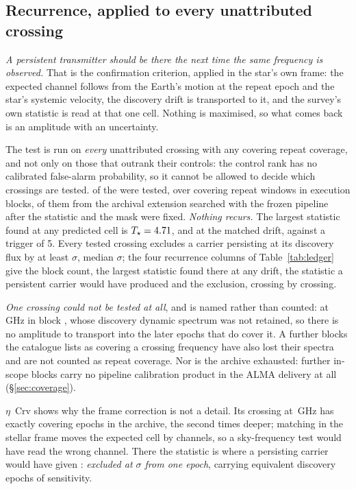 \subsection{Recurrence, applied to every unattributed crossing}
\label{sec:etacrv}

\emph{A persistent transmitter should be there the next time the same
frequency is observed.} That is the confirmation criterion, applied in the
star's own frame: the expected channel follows from the Earth's motion at the
repeat epoch and the star's systemic velocity, the discovery drift is
transported to it, and the survey's own statistic is read at that one cell.
Nothing is maximised, so what comes back is an amplitude with an uncertainty.

The test is run on \emph{every} unattributed crossing with any covering repeat
coverage, and not only on those that outrank their controls: the control rank
has no calibrated false-alarm probability, so it cannot be allowed to decide
which crossings are tested. \RcNTested{} of the \NUnattributed{} were tested,
over \RcNRepeatMeas{} covering repeat windows in \RcNRepeatBlock{} execution
blocks, \RcNRepeatFollow{} of them from the archival extension searched with
the frozen pipeline after the statistic and the mask were fixed. \emph{Nothing
recurs.} The largest statistic found at any predicted cell is
$T_\star=4.71$, and \RcTMatched{} at the matched drift, against a trigger
of 5. Every
tested crossing excludes a carrier persisting at its discovery flux by at
least \RcExclMin$\sigma$, median \RcExclMed$\sigma$; the four recurrence
columns of Table~\ref{tab:ledger} give the block count, the largest statistic
found there at any drift, the statistic a persistent carrier would have
produced and the exclusion, crossing by crossing.

\emph{One crossing could not be tested at all}, and is named rather than
counted: \RcUntStar{} at \RcUntFreq\,GHz in block \texttt{\RcUntEb}, whose
discovery dynamic spectrum was not retained, so there is no amplitude to
transport into the \RcUntNRep{} later epochs that do cover it. A further
\RcNCatNoSpec{} blocks the catalogue lists as covering a crossing frequency
have also lost their spectra and are not counted as repeat coverage. Nor is
the archive exhausted: \FateNoCal{} further in-scope blocks carry no pipeline
calibration product in the ALMA delivery at all (\S\ref{sec:coverage}).

$\eta$~Crv shows why the frame correction is not a detail. Its crossing at
\VnEcrFreq\,GHz has exactly \VnEcrNCover{} covering epochs in the archive, the
second \VnEcrDepthRatio{} times deeper; matching in the stellar frame moves the
expected cell by \VnEcrDchan{} channels, so a sky-frequency test would have
read the wrong channel. There the statistic is \VnEcrOtherT{} where a
persisting carrier would have given \VnEcrTPers: \emph{excluded at
\VnEcrExcl$\sigma$ from one epoch}, carrying \VnEcrNeff{} equivalent discovery
epochs of sensitivity.

